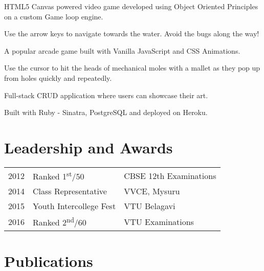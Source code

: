 \documentclass[]{deedy-resume-openfont}
\begin{document}
\begin{minipage}[t]{0.66\textwidth}
\begin{tightemize}
\item HTML5 Canvas powered video game developed using Object Oriented Principles on a custom Game loop engine.
\item Use the arrow keys to navigate towards the water. Avoid the bugs along the way!
\end{tightemize}
\sectionsep

\begin{tightemize}
\item A popular arcade game built with Vanilla JavaScript and CSS Animations.
\item Use the cursor to hit the heads of mechanical moles with a mallet as they pop up from holes quickly and repeatedly.
\end{tightemize}
\sectionsep

\begin{tightemize}
\item Full-stack CRUD application where users can showcase their art.
\item Built with Ruby - Sinatra, PostgreSQL and deployed on Heroku. 
\end{tightemize}
\sectionsep


\section{Leadership and Awards} 
\begin{tabular}{rll}
2012         & Ranked 1\textsuperscript{st}/50  & CBSE 12th Examinations\\
2014	     & Class Representative             & VVCE, Mysuru\\
2015	     & Youth Intercollege Fest          & VTU Belagavi\\
2016	     & Ranked 2\textsuperscript{nd}/60  & VTU Examinations\\


\end{tabular}
\sectionsep

\section{Publications} 
\renewcommand\refname{\vskip -1.5em} %


\nocite{*}

\end{minipage} 
\end{document}
